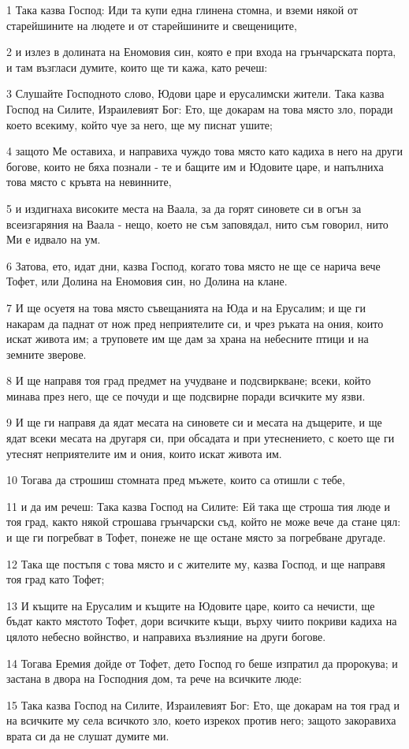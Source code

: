 \par 1 Така казва Господ: Иди та купи една глинена стомна, и вземи някой от старейшините на людете и от старейшините и свещениците,
\par 2 и излез в долината на Еномовия син, която е при входа на грънчарската порта, и там възгласи думите, които ще ти кажа, като речеш:
\par 3 Слушайте Господното слово, Юдови царе и ерусалимски жители. Така казва Господ на Силите, Израилевият Бог: Ето, ще докарам на това място зло, поради което всекиму, който чуе за него, ще му писнат ушите;
\par 4 защото Ме оставиха, и направиха чуждо това място като кадиха в него на други богове, които не бяха познали - те и бащите им и Юдовите царе, и напълниха това място с кръвта на невинните,
\par 5 и издигнаха високите места на Ваала, за да горят синовете си в огън за всеизгаряния на Ваала - нещо, което не съм заповядал, нито съм говорил, нито Ми е идвало на ум.
\par 6 Затова, ето, идат дни, казва Господ, когато това място не ще се нарича вече Тофет, или Долина на Еномовия син, но Долина на клане.
\par 7 И ще осуетя на това място съвещанията на Юда и на Ерусалим; и ще ги накарам да паднат от нож пред неприятелите си, и чрез ръката на ония, които искат живота им; а труповете им ще дам за храна на небесните птици и на земните зверове.
\par 8 И ще направя тоя град предмет на учудване и подсвиркване; всеки, който минава през него, ще се почуди и ще подсвирне поради всичките му язви.
\par 9 И ще ги направя да ядат месата на синовете си и месата на дъщерите, и ще ядат всеки месата на другаря си, при обсадата и при утеснението, с което ще ги утеснят неприятелите им и ония, които искат живота им.
\par 10 Тогава да строшиш стомната пред мъжете, които са отишли с тебе,
\par 11 и да им речеш: Така казва Господ на Силите: Ей така ще строша тия люде и тоя град, както някой строшава грънчарски съд, който не може вече да стане цял: и ще ги погребват в Тофет, понеже не ще остане място за погребване другаде.
\par 12 Така ще постъпя с това място и с жителите му, казва Господ, и ще направя тоя град като Тофет;
\par 13 И къщите на Ерусалим и къщите на Юдовите царе, които са нечисти, ще бъдат както мястото Тофет, дори всичките къщи, върху чиито покриви кадиха на цялото небесно войнство, и направиха възлияние на други богове.
\par 14 Тогава Еремия дойде от Тофет, дето Господ го беше изпратил да пророкува; и застана в двора на Господния дом, та рече на всичките люде:
\par 15 Така казва Господ на Силите, Израилевият Бог: Ето, ще докарам на тоя град и на всичките му села всичкото зло, което изрекох против него; защото закоравиха врата си да не слушат думите ми.

